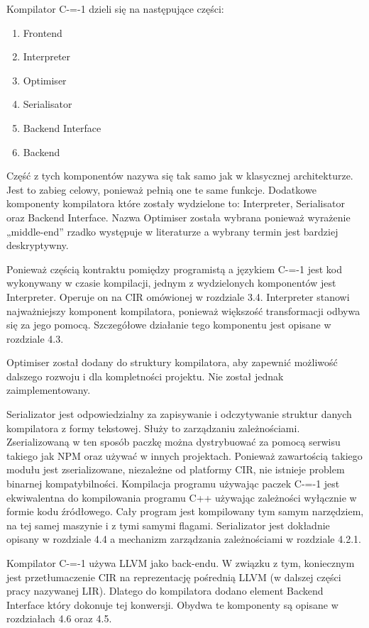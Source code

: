 Kompilator C-=-1 dzieli się na następujące części:
\begin{enumerate}
    \item Frontend
    \item Interpreter
    \item Optimiser
    \item Serialisator
    \item Backend Interface
    \item Backend
\end{enumerate}
Część z tych komponentów nazywa się tak samo jak w klasycznej architekturze. Jest to zabieg celowy, ponieważ pełnią one te same funkcje. Dodatkowe komponenty kompilatora które zostały wydzielone to: Interpreter, Serialisator oraz Backend Interface. Nazwa Optimiser została wybrana ponieważ wyrażenie „middle-end” rzadko występuje w literaturze a wybrany termin jest bardziej deskryptywny.

Ponieważ częścią kontraktu pomiędzy programistą a językiem C-=-1 jest kod wykonywany w czasie kompilacji, jednym z wydzielonych komponentów jest Interpreter. Operuje on na CIR omówionej w rozdziale 3.4. Interpreter stanowi najważniejszy komponent kompilatora, ponieważ większość transformacji odbywa się za jego pomocą. Szczegółowe działanie tego komponentu jest opisane w rozdziale 4.3.

Optimiser został dodany do struktury kompilatora, aby zapewnić możliwość dalszego rozwoju i dla kompletności projektu. Nie został jednak zaimplementowany.

Serializator jest odpowiedzialny za zapisywanie i odczytywanie struktur danych kompilatora z formy tekstowej. Służy to zarządzaniu zależnościami. Zserializowaną w ten sposób paczkę można dystrybuować za pomocą serwisu takiego jak NPM oraz używać w innych projektach. Ponieważ zawartością takiego modułu jest zserializowane, niezależne od platformy CIR, nie istnieje problem binarnej kompatybilności. Kompilacja programu używając paczek C-=-1 jest ekwiwalentna do kompilowania programu C++ używając zależności wyłącznie w formie kodu źródłowego. Cały program jest kompilowany tym samym narzędziem, na tej samej maszynie i z tymi samymi flagami. Serializator jest dokładnie opisany w rozdziale 4.4 a mechanizm zarządzania zależnościami w rozdziale 4.2.1.

Kompilator C-=-1 używa LLVM jako back-endu. W związku z tym, koniecznym jest przetłumaczenie CIR na reprezentację pośrednią LLVM (w dalszej części pracy nazywanej LIR). Dlatego do kompilatora dodano element Backend Interface który dokonuje tej konwersji. Obydwa te komponenty są opisane w rozdziałach 4.6 oraz 4.5.
 
